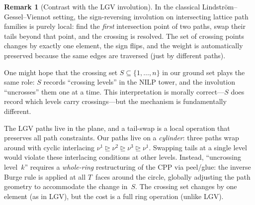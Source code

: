 \documentclass[11pt]{article}
\theoremstyle{plain}
\theoremstyle{definition}
\newtheorem{remark}[theorem]{Remark}
\begin{document}
\begin{remark}[Contrast with the LGV involution]
\label{rmk:lgv}
In the classical Lindstr\"om--Gessel--Viennot setting, the
sign-reversing involution on intersecting lattice path families is
purely local: find the \emph{first} intersection point of two paths,
swap their tails beyond that point, and the crossing is resolved.
The set of crossing points changes by exactly one element, the sign
flips, and the weight is automatically preserved because the same
edges are traversed (just by different paths).

One might hope that the crossing set $S \subseteq \{1, \ldots, n\}$
in our ground set plays the same role: $S$ records ``crossing
levels'' in the NILP tower, and the involution ``uncrosses'' them
one at a time.  This interpretation is morally correct---$S$ does
record which levels carry crossings---but the mechanism is
fundamentally different.

The LGV paths live in the plane, and a tail-swap is a local
operation that preserves all path constraints.  Our paths live on a
\emph{cylinder}: three paths wrap around with cyclic interlacing
$\nu^1 \unrhd \nu^2 \unrhd \nu^3 \unrhd \nu^1$.  Swapping tails
at a single level would violate these interlacing conditions at
other levels.  Instead, ``uncrossing level~$k$'' requires a
\emph{whole-ring} restructuring of the CPP via peel/glue:
the inverse Burge rule is applied at all $T$~faces around the
circle, globally adjusting the path geometry to accommodate the
change in~$S$.  The crossing set changes by one element (as in
LGV), but the cost is a full ring operation (unlike LGV).
\end{remark}
\end{document}
